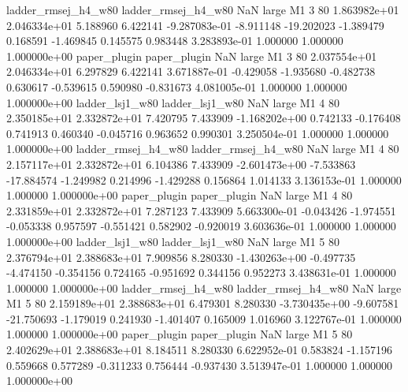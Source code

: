 ladder_rmsej_h4_w80 ladder_rmsej_h4_w80                   NaN      large       M1                 3 80 1.863982e+01   2.046334e+01      5.188960       6.422141 -9.287083e-01     -8.911148    -19.202023    -1.389479       0.168591 -1.469845   0.145575     0.983448   3.283893e-01            1.000000        1.000000        1.000000e+00
       paper_plugin        paper_plugin                   NaN      large       M1                 3 80 2.037554e+01   2.046334e+01      6.297829       6.422141  3.671887e-01     -0.429058     -1.935680    -0.482738       0.630617 -0.539615   0.590980    -0.831673   4.081005e-01            1.000000        1.000000        1.000000e+00
    ladder_lsj1_w80     ladder_lsj1_w80                   NaN      large       M1                 4 80 2.350185e+01   2.332872e+01      7.420795       7.433909 -1.168202e+00      0.742133     -0.176408     0.741913       0.460340 -0.045716   0.963652     0.990301   3.250504e-01            1.000000        1.000000        1.000000e+00
ladder_rmsej_h4_w80 ladder_rmsej_h4_w80                   NaN      large       M1                 4 80 2.157117e+01   2.332872e+01      6.104386       7.433909 -2.601473e+00     -7.533863    -17.884574    -1.249982       0.214996 -1.429288   0.156864     1.014133   3.136153e-01            1.000000        1.000000        1.000000e+00
       paper_plugin        paper_plugin                   NaN      large       M1                 4 80 2.331859e+01   2.332872e+01      7.287123       7.433909  5.663300e-01     -0.043426     -1.974551    -0.053338       0.957597 -0.551421   0.582902    -0.920019   3.603636e-01            1.000000        1.000000        1.000000e+00
    ladder_lsj1_w80     ladder_lsj1_w80                   NaN      large       M1                 5 80 2.376794e+01   2.388683e+01      7.909856       8.280330 -1.430263e+00     -0.497735     -4.474150    -0.354156       0.724165 -0.951692   0.344156     0.952273   3.438631e-01            1.000000        1.000000        1.000000e+00
ladder_rmsej_h4_w80 ladder_rmsej_h4_w80                   NaN      large       M1                 5 80 2.159189e+01   2.388683e+01      6.479301       8.280330 -3.730435e+00     -9.607581    -21.750693    -1.179019       0.241930 -1.401407   0.165009     1.016960   3.122767e-01            1.000000        1.000000        1.000000e+00
       paper_plugin        paper_plugin                   NaN      large       M1                 5 80 2.402629e+01   2.388683e+01      8.184511       8.280330  6.622952e-01      0.583824     -1.157196     0.559668       0.577289 -0.311233   0.756444    -0.937430   3.513947e-01            1.000000        1.000000        1.000000e+00
